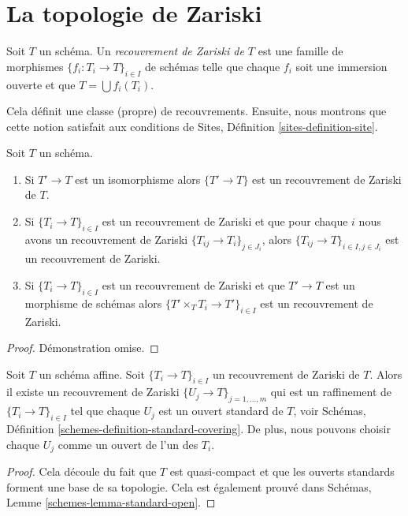 \section{La topologie de Zariski}
\label{section-zariski}

\begin{definition}
\label{definition-zariski-covering}
Soit $T$ un schéma. Un {\it recouvrement de Zariski de $T$} est une famille de morphismes $\{f_i : T_i \to T\}_{i \in I}$ de schémas telle que chaque $f_i$ soit une immersion ouverte et que $T = \bigcup f_i(T_i)$.
\end{definition}

\noindent
Cela définit une classe (propre) de recouvrements. Ensuite, nous montrons que cette notion satisfait aux conditions de Sites, Définition \ref{sites-definition-site}.

\begin{lemma}
\label{lemma-zariski}
Soit $T$ un schéma.
\begin{enumerate}
\item Si $T' \to T$ est un isomorphisme alors $\{T' \to T\}$ est un recouvrement de Zariski de $T$.
\item Si $\{T_i \to T\}_{i\in I}$ est un recouvrement de Zariski et que pour chaque $i$ nous avons un recouvrement de Zariski $\{T_{ij} \to T_i\}_{j\in J_i}$, alors $\{T_{ij} \to T\}_{i \in I, j\in J_i}$ est un recouvrement de Zariski.
\item Si $\{T_i \to T\}_{i\in I}$ est un recouvrement de Zariski et que $T' \to T$ est un morphisme de schémas alors $\{T' \times_T T_i \to T'\}_{i\in I}$ est un recouvrement de Zariski.
\end{enumerate}
\end{lemma}

\begin{proof}
Démonstration omise.
\end{proof}

\begin{lemma}
\label{lemma-zariski-affine}
Soit $T$ un schéma affine. Soit $\{T_i \to T\}_{i \in I}$ un recouvrement de Zariski de $T$. Alors il existe un recouvrement de Zariski $\{U_j \to T\}_{j = 1, \ldots, m}$ qui est un raffinement de $\{T_i \to T\}_{i \in I}$ tel que chaque $U_j$ est un ouvert standard de $T$, voir Schémas, Définition \ref{schemes-definition-standard-covering}. De plus, nous pouvons choisir chaque $U_j$ comme un ouvert de l'un des $T_i$.
\end{lemma}

\begin{proof}
Cela découle du fait que $T$ est quasi-compact et que les ouverts standards forment une base de sa topologie. Cela est également prouvé dans Schémas, Lemme \ref{schemes-lemma-standard-open}.
\end{proof}


